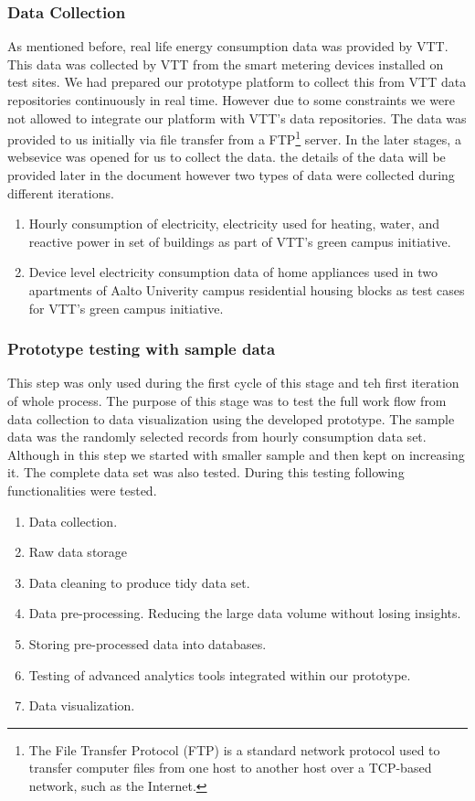 \subsubsection{Data Collection}
As mentioned before, real life energy consumption data was provided by VTT. This data was collected by VTT from the smart metering devices installed on test sites. We had prepared our prototype platform to collect this from VTT data repositories continuously in real time. However due to some constraints we were not allowed to integrate our platform with VTT's data repositories. The data was provided to us initially via file transfer from a FTP\footnote{The File Transfer Protocol (FTP) is a standard network protocol used to transfer computer files from one host to another host over a TCP-based network, such as the Internet.} server. In the later stages, a websevice was opened for us to collect the data. the details of the data will be provided later in the document however two types of data were collected during different iterations.
\begin{enumerate}
\item Hourly consumption of electricity, electricity used for heating, water, and reactive power in set of buildings as part of VTT's green campus initiative.
\item Device level electricity consumption data of home appliances used in two apartments of Aalto Univerity campus residential housing blocks as test cases for VTT's green campus initiative.

\end{enumerate}
\subsubsection{Prototype testing with sample data}\label{prototype}
This step was only used during the first cycle of this stage and teh first iteration of whole process. The purpose of this stage was to test the full work flow from data collection to data visualization using the developed prototype. The sample data was the randomly selected records from hourly consumption data set. Although in this step we started with smaller sample and then kept on increasing it. The complete data set was also tested. During this testing following functionalities were tested.
\begin{enumerate}
\item Data collection.
\item Raw data storage
\item Data cleaning to produce tidy data set.
\item Data pre-processing. Reducing the large data volume without losing insights. 
\item Storing pre-processed data into databases.
\item Testing of advanced analytics tools integrated within our prototype.
\item Data visualization.  
\end{enumerate}
